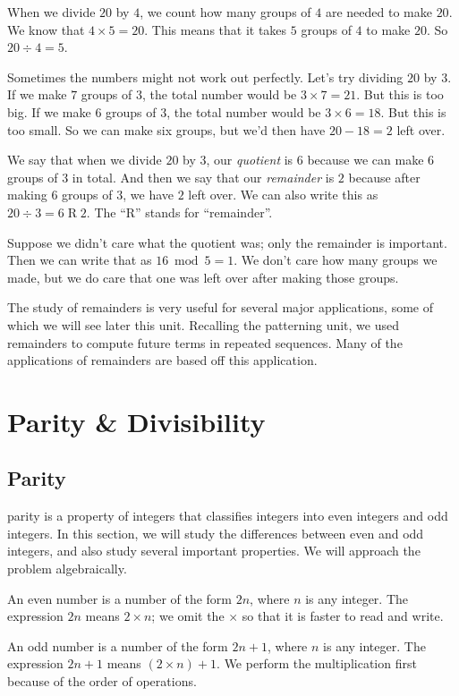 \documentclass[a4paper,10pt]{report}
\begin{document}
When we divide $20$ by $4$, we count how many groups of $4$ are needed to make
$20$. We know that $4 \times 5 = 20$. This means that it takes $5$ groups of $4$
to make $20$. So $20 \div 4 = 5$.

Sometimes the numbers might not work out perfectly. Let's try dividing $20$ by
$3$. If we make $7$ groups of $3$, the total number would be $3 \times 7 = 21$.
But this is too big. If we make $6$ groups of $3$, the total number would be $3
\times 6 = 18$. But this is too small. So we can make six groups, but we'd then
have $20 - 18 = 2$ left over.

We say that when we divide $20$ by $3$, our \emph{quotient} is $6$ because we
can make $6$ groups of $3$ in total. And then we say that our \emph{remainder}
is $2$ because after making $6$ groups of $3$, we have $2$ left over. We can
also write this as $20 \div 3 = 6 \operatorname{R} 2$. The ``R'' stands for
``remainder''.

Suppose we didn't care what the quotient was; only the remainder is important.
Then we can write that as $16 \bmod 5 = 1$. We don't care how many groups we
made, but we do care that one was left over after making those groups.

The study of remainders is very useful for several major applications, some of
which we will see later this unit. Recalling the patterning unit, we used
remainders to compute future terms in repeated sequences. Many of the
applications of remainders are based off this application.


\chapter{Parity \& Divisibility}

\section{Parity}

\Gls{parity} is a property of integers that classifies integers into even
integers and odd integers. In this section, we will study the differences
between even and odd integers, and also study several important properties. We
will approach the problem algebraically.

An even number is a number of the form $2n$, where $n$ is any integer. The
expression $2n$ means $2\times n$; we omit the $\times$ so that it is faster to
read and write.

An odd number is a number of the form $2n+1$, where $n$ is any integer. The
expression $2n+1$ means $(2\times n) + 1$. We perform the multiplication first
because of the order of operations.
\end{document}
